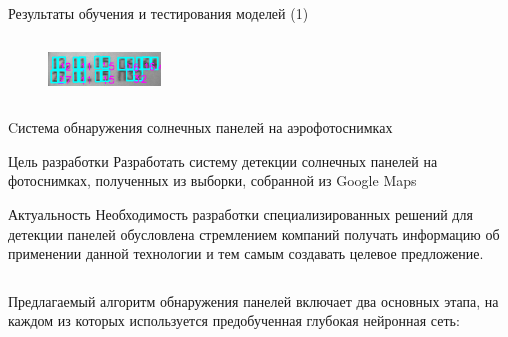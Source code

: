 \documentclass[10pt]{beamer}
\begin{document}
\begin{frame}{Результаты обучения и тестирования моделей (1)}
\begin{columns}
\begin{column}{0.45\textwidth}
\begin{figure}
                    \end{figure}
                    \begin{figure}
                        \centering
                        \includegraphics[width=3cm]{pic4-26.png}
                    \end{figure}
                \end{column}
            \end{columns}
        \end{frame}

        \begin{frame}{Cистема обнаружения солнечных панелей на аэрофотоснимках}
            \small
            \begin{block}{Цель разработки}
                Разработать систему детекции солнечных панелей на фотоснимках, полученных из выборки, собранной из Google Maps
            \end{block}
            \begin{block}{Актуальность}
                Необходимость разработки специализированных решений для детекции панелей обусловлена стремлением компаний получать информацию об применении данной технологии и тем самым создавать целевое предложение.
            \end{block}
            
            \begin{columns}
                \begin{column}{0.5\textwidth}
                    Предлагаемый алгоритм обнаружения панелей включает два основных этапа, на каждом из которых используется предобученная глубокая нейронная сеть: 


\end{column}
\end{columns}
\end{frame}
\end{document}
